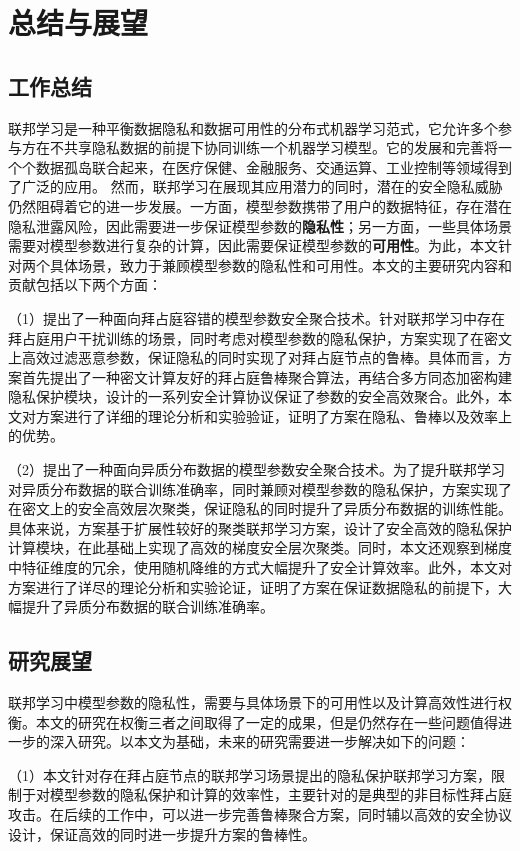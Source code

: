 \chapter{总结与展望}
\section{工作总结}
联邦学习是一种平衡数据隐私和数据可用性的分布式机器学习范式，它允许多个参与方在不共享隐私数据的前提下协同训练一个机器学习模型。它的发展和完善将一个个数据孤岛联合起来，在医疗保健、金融服务、交通运算、工业控制等领域得到了广泛的应用。
然而，联邦学习在展现其应用潜力的同时，潜在的安全隐私威胁仍然阻碍着它的进一步发展。一方面，模型参数携带了用户的数据特征，存在潜在隐私泄露风险，因此需要进一步保证模型参数的\textbf{隐私性}；另一方面，一些具体场景需要对模型参数进行复杂的计算，因此需要保证模型参数的\textbf{可用性}。为此，本文针对两个具体场景，致力于兼顾模型参数的隐私性和可用性。本文的主要研究内容和贡献包括以下两个方面：

（1）提出了一种面向拜占庭容错的模型参数安全聚合技术。针对联邦学习中存在拜占庭用户干扰训练的场景，同时考虑对模型参数的隐私保护，方案实现了在密文上高效过滤恶意参数，保证隐私的同时实现了对拜占庭节点的鲁棒。具体而言，方案首先提出了一种密文计算友好的拜占庭鲁棒聚合算法，再结合多方同态加密构建隐私保护模块，设计的一系列安全计算协议保证了参数的安全高效聚合。此外，本文对方案进行了详细的理论分析和实验验证，证明了方案在隐私、鲁棒以及效率上的优势。

（2）提出了一种面向异质分布数据的模型参数安全聚合技术。为了提升联邦学习对异质分布数据的联合训练准确率，同时兼顾对模型参数的隐私保护，方案实现了在密文上的安全高效层次聚类，保证隐私的同时提升了异质分布数据的训练性能。具体来说，方案基于扩展性较好的聚类联邦学习方案，设计了安全高效的隐私保护计算模块，在此基础上实现了高效的梯度安全层次聚类。同时，本文还观察到梯度中特征维度的冗余，使用随机降维的方式大幅提升了安全计算效率。此外，本文对方案进行了详尽的理论分析和实验论证，证明了方案在保证数据隐私的前提下，大幅提升了异质分布数据的联合训练准确率。

\section{研究展望}
联邦学习中模型参数的隐私性，需要与具体场景下的可用性以及计算高效性进行权衡。本文的研究在权衡三者之间取得了一定的成果，但是仍然存在一些问题值得进一步的深入研究。以本文为基础，未来的研究需要进一步解决如下的问题：

（1）本文针对存在拜占庭节点的联邦学习场景提出的隐私保护联邦学习方案，限制于对模型参数的隐私保护和计算的效率性，主要针对的是典型的非目标性拜占庭攻击。在后续的工作中，可以进一步完善鲁棒聚合方案，同时辅以高效的安全协议设计，保证高效的同时进一步提升方案的鲁棒性。

